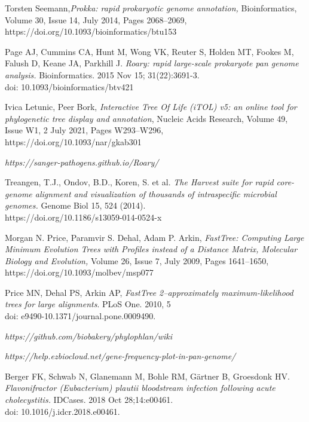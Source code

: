 \documentclass[a4paper,titlepage, oneside]{book}
\begin{document}
\begin{thebibliography}{}
Torsten Seemann,\emph{Prokka: rapid prokaryotic genome annotation,} Bioinformatics, Volume 30, Issue 14, July 2014, Pages 2068–2069,\\ https://doi.org/10.1093/bioinformatics/btu153

Page AJ, Cummins CA, Hunt M, Wong VK, Reuter S, Holden MT, Fookes M, Falush D, Keane JA, Parkhill J. \emph{Roary: rapid large-scale prokaryote pan genome analysis.} Bioinformatics. 2015 Nov 15; 31(22):3691-3. \\doi: 10.1093/bioinformatics/btv421

Ivica Letunic, Peer Bork, \emph{Interactive Tree Of Life (iTOL) v5: an online tool for phylogenetic tree display and annotation}, Nucleic Acids Research, Volume 49, Issue W1, 2 July 2021, Pages W293–W296, \\https://doi.org/10.1093/nar/gkab301

\emph{https://sanger-pathogens.github.io/Roary/}

Treangen, T.J., Ondov, B.D., Koren, S. et al. \emph{The Harvest suite for rapid core-genome alignment and visualization of thousands of intraspecific microbial genomes.} Genome Biol 15, 524 (2014).\\https://doi.org/10.1186/s13059-014-0524-x

Morgan N. Price, Paramvir S. Dehal, Adam P. Arkin, \emph{FastTree: Computing Large Minimum Evolution Trees with Profiles instead of a Distance Matrix, Molecular Biology and Evolution,} Volume 26, Issue 7, July 2009, Pages 1641–1650, \\https://doi.org/10.1093/molbev/msp077


Price MN, Dehal PS, Arkin AP, \emph{FastTree 2–approximately maximum-likelihood trees for large alignments}. PLoS One. 2010, 5\\doi: e9490-10.1371/journal.pone.0009490.


\emph{https://github.com/biobakery/phylophlan/wiki}


\emph{https://help.ezbiocloud.net/gene-frequency-plot-in-pan-genome/}

Berger FK, Schwab N, Glanemann M, Bohle RM, Gärtner B, Groesdonk HV. \emph{Flavonifractor (Eubacterium) plautii bloodstream infection following acute cholecystitis.} IDCases. 2018 Oct 28;14:e00461. \\doi: 10.1016/j.idcr.2018.e00461.


\end{thebibliography}
\end{document}

